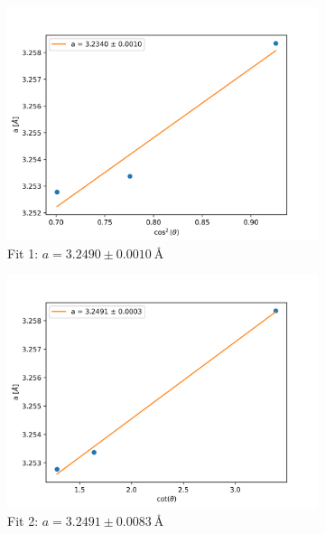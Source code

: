 \documentclass{article}
\begin{document}
\begin{figure}[h]
	\centering
	\begin {subfigure}{0.3\textwidth}
		\centering
		\includegraphics[width=\textwidth]{Figures/ZnOCosA.png}
		\caption{Fit 1: $a=3.2490 \pm \SI{0.0010}{\angstrom} $}
		\label{fig:ZnOFit1}
	\end{subfigure}
	\hfill
	\begin {subfigure}{0.3\textwidth}
		\centering
		\includegraphics[width=\textwidth]{Figures/ZnOCotA.png}
		\caption{Fit 2: $a=3.2491 \pm \SI{0.0083}{\angstrom} $}
		\label{fig:ZnOFit2}
	\end{subfigure}
	\hfill
	\begin {subfigure}{0.3\textwidth}
		\centering

\end{subfigure}
\end{figure}
\end{document}
